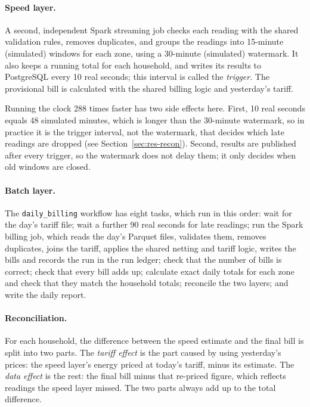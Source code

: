 \documentclass[11pt,a4paper]{article}
\begin{document}
\paragraph{Speed layer.} A second, independent Spark streaming job checks each reading with
the shared validation rules, removes duplicates, and groups the readings into 15-minute
(simulated) windows for each zone, using a 30-minute (simulated) watermark. It also keeps a
running total for each household, and writes its results to PostgreSQL every 10 real
seconds; this interval is called the \emph{trigger}. The provisional bill is calculated with
the shared billing logic and yesterday's tariff.

Running the clock 288 times faster has two side effects here. First, 10 real seconds equals
48 simulated minutes, which is longer than the 30-minute watermark, so in practice it is the
trigger interval, not the watermark, that decides which late readings are dropped (see
Section~\ref{sec:res-recon}). Second, results are published after every trigger, so the
watermark does not delay them; it only decides when old windows are closed.

\paragraph{Batch layer.} The \texttt{daily\_billing} workflow has eight tasks, which run in
this order: wait for the day's tariff file; wait a further 90 real seconds for late
readings; run the Spark billing job, which reads the day's Parquet files, validates them,
removes duplicates, joins the tariff, applies the shared netting and tariff logic, writes the
bills and records the run in the run ledger; check that the number of bills is correct; check
that every bill adds up; calculate exact daily totals for each zone and check that they match
the household totals; reconcile the two layers; and write the daily report.

\paragraph{Reconciliation.} For each household, the difference between the speed estimate and
the final bill is split into two parts. The \emph{tariff effect} is the part caused by using
yesterday's prices: the speed layer's energy priced at today's tariff, minus its estimate.
The \emph{data effect} is the rest: the final bill minus that re-priced figure, which reflects
readings the speed layer missed. The two parts always add up to the total difference.
\end{document}
